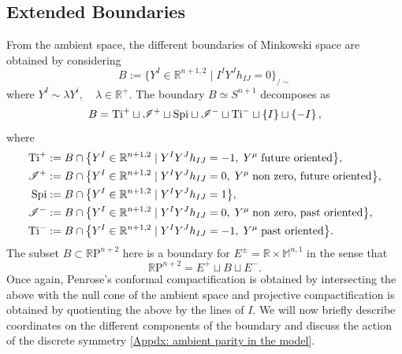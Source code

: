 \documentclass[a4paper, 10pt]{article}
\theoremstyle{remark}
\newcommand{\Ti}{\textnormal{Ti}}
\newcommand{\Spi}{\textnormal{Spi}}
\newcommand{\Scri}{\mathscr{I}}
\begin{document}
\subsection{Extended Boundaries}

From the ambient space, the different boundaries of Minkowski space are obtained by considering 
\begin{equation}
   B := \big\{ Y^I \in \mathbb{R}^{n+1,2} \;\vert \; I^{I}  Y^{J} h_{IJ}= 0 \big\}_{/ \sim}
\end{equation}
where $Y^I \sim \lambda Y^i,\quad  \lambda\in \mathbb{R}^+$. The boundary $B \simeq S^{n+1}$ decomposes as
\begin{equation}
    B = \Ti^{+} \sqcup \Scri^{+} \sqcup \Spi \sqcup \Scri^{-} \sqcup \Ti^{-} \sqcup \left \{ I \right\} \sqcup \left \{ -I \right\},
\end{equation}
where
\begin{align}
\Ti^{+} &:= B \cap \big\{ Y^I \in \mathbb{R}^{n+1,2} \;\vert\; Y^IY^J h_{IJ} = -1, \; Y^{\mu} \; \textrm{future oriented} \big\},  \nonumber\\
   \mathscr{I}^{+} &:= B \cap \big\{ Y^I \in \mathbb{R}^{n+1,2} \;\vert\; Y^IY^J h_{IJ} =0, \; Y^{\mu} \; \textrm{non zero, future oriented} \big\}, \nonumber\\
        \Spi &:= B \cap \big\{ Y^I \in \mathbb{R}^{n+1,2} \;\vert\; Y^IY^J h_{IJ} = 1 \big\},  \\
   \mathscr{I}^{-} &:= B \cap \big\{ Y^I \in \mathbb{R}^{n+1,2} \;\vert\; Y^IY^J h_{IJ} =0, \; Y^{\mu} \; \textrm{non zero, past oriented} \big\},  \nonumber\\
   \Ti^{-} &:= B \cap \big\{ Y^I \in \mathbb{R}^{n+1,2} \;\vert\; Y^IY^J h_{IJ} = -1, \; Y^{\mu} \; \textrm{past oriented} \big\}.   \nonumber
\end{align}
The subset $B \subset \mathbb{R}\textrm{P}^{n+2}$ here is a boundary for $E^{\pm} = \mathbb{R} \times \mathbb{M}^{n,1}$ in the sense that
\begin{equation}
    \mathbb{R}\textrm{P}^{n+2} = E^{+} \sqcup B \sqcup E^-.
\end{equation}
Once again, Penrose's conformal compactification is obtained by intersecting the above with the null cone of the ambient space and projective compactification is obtained by quotienting the above by the lines of $I$. We will now briefly describe coordinates on the different components of the boundary and discuss the action of the discrete symmetry \eqref{Appdx: ambient parity in the model}.
\end{document}
